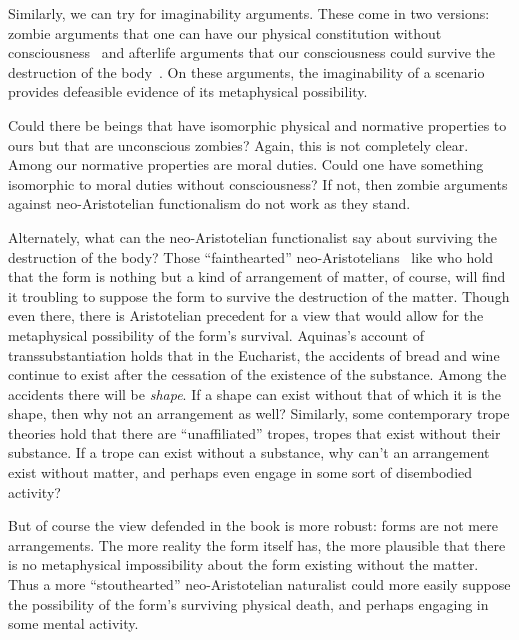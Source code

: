 Similarly, we can try for imaginability arguments. These come in two versions: zombie arguments that one can have our physical
constitution without consciousness~\parencite{Chalmers1996} and afterlife arguments that our consciousness could survive the destruction of the body~\parencite{SwinburneSoul1997}.
On these arguments, the imaginability of a scenario provides defeasible evidence of its metaphysical possibility. 

Could there be beings that have isomorphic physical and normative properties to ours
but that are unconscious zombies? Again, this is not completely clear. Among our normative properties are moral duties. Could one
have something isomorphic to moral duties without consciousness? If not, then zombie arguments against neo-Aristotelian functionalism 
do not work as they stand. 

Alternately, what can the neo-Aristotelian functionalist say about surviving the destruction of the body? Those ``fainthearted'' neo-Aristotelians~ like 
who hold that the form is nothing but a kind of arrangement of matter, of course, will find it troubling to
suppose the form to survive the destruction of the matter. Though even there, there is Aristotelian precedent for a view
that would allow for the metaphysical possibility of the form's survival. Aquinas's account of transsubstantiation holds that in the Eucharist, the accidents of
bread and wine continue to exist after the cessation of the existence of the substance. Among the accidents there will be 
\textit{shape}. If a shape can exist without that of which it is the shape, then why not an arrangement as well? Similarly,
some contemporary trope theories hold that there are ``unaffiliated'' tropes, tropes that exist without their substance. If a 
trope can exist without a substance, why can't an arrangement exist without matter, and perhaps even engage in some
sort of disembodied activity? 

But of course the view defended in the book is more robust: forms are not mere arrangements. The more reality the form itself
has, the more plausible that there is no metaphysical impossibility about the form existing without the matter. 
Thus a more ``stouthearted'' neo-Aristotelian naturalist could more easily suppose the possibility of the form's
surviving physical death, and perhaps engaging in some mental activity.

